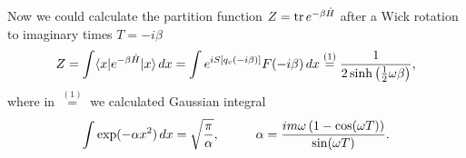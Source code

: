 Now we could calculate the partition function $Z = \mathop{\mathrm{tr}}\nolimits e^{- \beta \hat{H}}$ after a Wick rotation to imaginary times $T = - i \beta$
\begin{equation*}
	Z = \int \bk{x}[e^{- \beta \hat{H}}]{x} \d x = \int e^{i S[q_c(-i \beta)]}F(-i \beta) \d x \overset{(1)}{=}  \frac{1}{2 \sh\left(\tfrac{1}{2} \omega \beta\right)},
\end{equation*}
where in $\overset{(1)}{=}$ we calculated Gaussian integral 
\begin{equation*}
	\int \exp(- \alpha x^2) \d x = \sqrt{\frac{\pi}{\alpha}},
	\hspace{10 mm} 
	\alpha = \frac{ i m \omega \left(1 - \cos (\omega T)\right)}{\sin (\omega T)}.
\end{equation*}